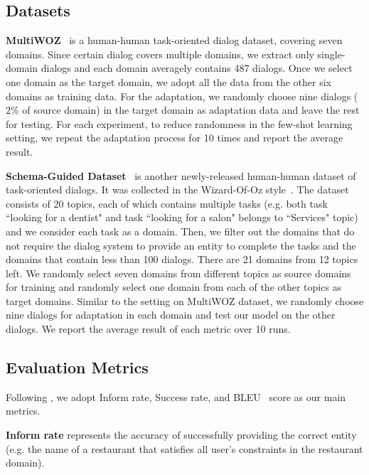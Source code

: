 \documentclass[letterpaper]{article} %
\begin{document}
\subsection*{Datasets}
\label{multiwoz}
\noindent \textbf{MultiWOZ}~\citep{budzianowski2018multiwoz} is a human-human task-oriented dialog dataset, covering seven domains. Since certain dialog covers multiple domains, we extract only single-domain dialogs and each domain averagely contains 487 dialogs. Once we select one domain as the target domain, we adopt all the data from the other six domains as training data. For the adaptation, we randomly choose nine dialogs ($2\%$ of source domain) in the target domain as adaptation data and leave the rest for testing. For each experiment, to reduce randomness in the few-shot learning setting, we repeat the adaptation process for 10 times and report the average result.

\noindent\textbf{Schema-Guided Dataset}~\citep{rastogi2019towards} is another newly-released human-human dataset of task-oriented dialogs. It was collected in the Wizard-Of-Oz style~\citep{Kelley1984AnID}. The dataset consists of 20 topics, each of which contains multiple tasks (e.g. both task ``looking for a dentist" and task ``looking for a salon" belongs to ``Services" topic) and we consider each task as a domain. Then, we filter out the domains that do not require the dialog system to provide an entity to complete the tasks and the domains that contain less than 100 dialogs. There are 21 domains from 12 topics left. We randomly select seven domains from different topics as source domains for training and randomly select one domain from each of the other topics as target domains. Similar to the setting on MultiWOZ dataset, we randomly choose nine dialogs for adaptation in each domain and test our model on the other dialogs. We report the average result of each metric over 10 runs.



\subsection*{Evaluation Metrics}

Following \citet{budzianowski2018multiwoz}, we adopt Inform rate, Success rate, and BLEU~\citep{Papineni2002BleuAM} score as our main metrics.

\noindent\textbf{Inform rate} represents the accuracy of successfully providing the correct entity (e.g. the name of a restaurant that satisfies all user's constraints in the restaurant domain).
\end{document}

